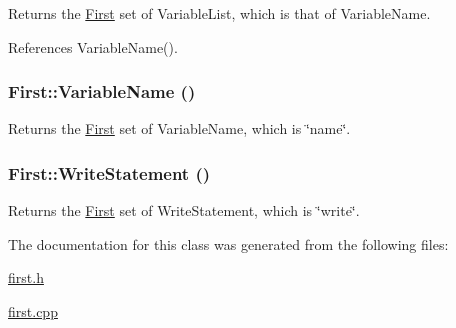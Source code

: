 Returns the \hyperlink{classFirst}{First} set of VariableList, which is that of VariableName. 



References VariableName().

\hypertarget{classFirst_a43688eea61d648abe3ed2c006c712ff8}{
\subsubsection[{VariableName}]{ First::VariableName ()}}
\label{classFirst_a43688eea61d648abe3ed2c006c712ff8}


Returns the \hyperlink{classFirst}{First} set of VariableName, which is \char`\"{}name\char`\"{}. 

\hypertarget{classFirst_ab293c9f0bd36e9696dcb336391df35a4}{
\subsubsection[{WriteStatement}]{ First::WriteStatement ()}}
\label{classFirst_ab293c9f0bd36e9696dcb336391df35a4}


Returns the \hyperlink{classFirst}{First} set of WriteStatement, which is \char`\"{}write\char`\"{}. 



The documentation for this class was generated from the following files:\begin{DoxyCompactItemize}
\item 
\hyperlink{first_8h}{first.h}\item 
\hyperlink{first_8cpp}{first.cpp}\end{DoxyCompactItemize}
